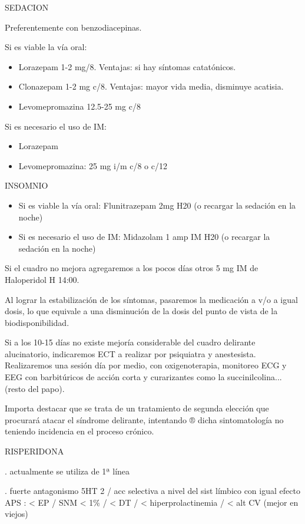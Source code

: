 SEDACION

Preferentemente con benzodiacepinas.

Si es viable la vía oral:
\begin{itemize}
 \item Lorazepam 1-2 mg/8. Ventajas: si hay síntomas catatónicos.
 \item Clonazepam 1-2 mg c/8. Ventajas: mayor vida media, disminuye acatisia.
 \item Levomepromazina 12.5-25 mg c/8
\end{itemize}

Si es necesario el uso de IM:
\begin{itemize}
 \item Lorazepam
 \item Levomepromazina: 25 mg i/m c/8 o c/12
\end{itemize}

INSOMNIO
\begin{itemize}
 \item Si es viable la vía oral: Flunitrazepam 2mg H20 (o recargar la sedación en la noche)
 \item Si es necesario el uso de IM: Midazolam 1 amp IM H20 (o recargar la sedación en la noche)
\end{itemize}

Si el cuadro no mejora agregaremos a los pocos días otros 5 mg IM de Haloperidol H 14:00.

Al lograr la estabilización de los síntomas, pasaremos la medicación a v/o a igual dosis, lo que equivale a una disminución de la dosis del punto de vista de la biodisponibilidad.

Si a los 10-15 días no existe mejoría considerable del cuadro delirante alucinatorio, indicaremos ECT a realizar por psiquiatra y anestesista. Realizaremos una sesión día por medio, con oxigenoterapia, monitoreo ECG y EEG con barbitúricos de acción corta y curarizantes como la succinilcolina... (resto del papo).

Importa destacar que se trata de un tratamiento de segunda elección que procurará atacar el síndrome delirante, intentando ® dicha sintomatología no teniendo incidencia en el proceso crónico.

RISPERIDONA

. actualmente se utiliza de 1ª línea

. fuerte antagonismo 5HT 2 / acc selectiva a nivel del sist límbico con igual efecto APS : < EP / SNM < 1\% / < DT / < hiperprolactinemia / < alt CV (mejor en viejos)

